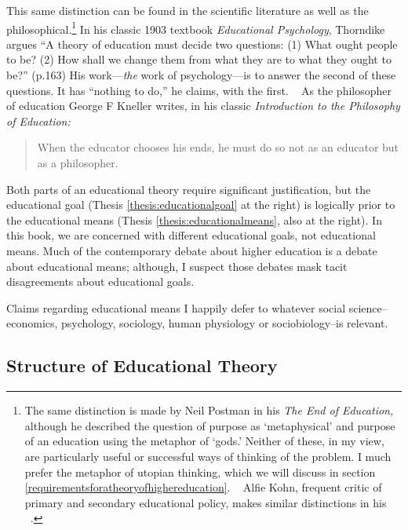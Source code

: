 This same distinction can be found in the scientific literature as well as the philosophical.\footnote{The same distinction is made by Neil Postman in his \emph{The End of Education,} although he described the question of purpose as `metaphysical' and purpose of an education using the metaphor of `gods.' Neither of these, in my view, are particularly useful or successful ways of thinking of the problem. I much prefer the metaphor of utopian thinking, which we will discuss in section \ref{requirementsforatheoryofhighereducation}. ~\citep{Postman:KxCN2dtO}
Alfie Kohn, frequent critic of primary and secondary educational policy, makes similar distinctions in his ~\citep{Kohn:2004vz}.} In his classic 1903 textbook \emph{Educational Psychology}, Thorndike argues ``A theory of education must decide two questions: (1) What ought people to be? (2) How shall we change them from what they are to what they ought to be?'' (p.163) His work---\emph{the} work of psychology---is to answer the second of these questions. It has ``nothing to do,'' he claims, with the first. ~\citep{Thorndike:1903vy} As the philosopher of education George F Kneller writes, in his classic \emph{Introduction to the Philosophy of Education:}

\begin{quote}

When the educator chooses his ends, he must do so not as an educator but as a philosopher. ~\citep[P. 23]{Kneller:1971wq}
\end{quote}

Both parts of an educational theory require significant justification, but the educational goal (Thesis \ref{thesis:educationalgoal} at the right) is logically prior to the educational means (Thesis \ref{thesis:educationalmeans}, also at the right). In this book, we are concerned with different educational goals, not educational means. Much of the contemporary debate about higher education is a debate about educational means; although, I suspect those debates mask tacit disagreements about educational goals.

Claims regarding educational means I happily defer to whatever social science--economics, psychology, sociology, human physiology or sociobiology--is relevant.

\subsection{Structure of Educational Theory}
\label{structureofeducationaltheory}


